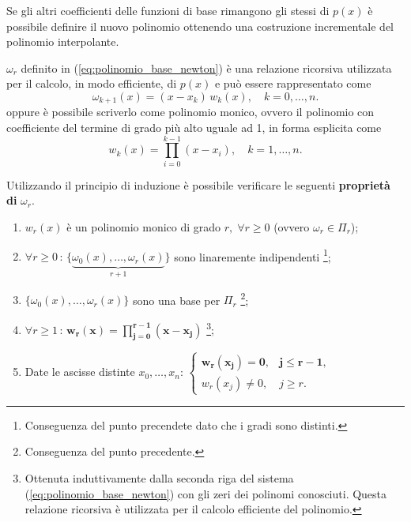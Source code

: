 
Se gli altri coefficienti delle funzioni di base rimangono gli stessi di $p(x)$ è possibile definire il nuovo polinomio ottenendo una costruzione incrementale del polinomio interpolante.

\begin{remark}
	$\omega_r$ definito in (\ref{eq:polinomio_base_newton}) è una relazione ricorsiva utilizzata per il calcolo, in modo efficiente, di $p(x)$ e può essere rappresentato come
	\begin{equation*}
	    \omega_{k+1}(x)=(x-x_k)\, w_k(x),\quad k=0,\hdots, n.
	\end{equation*}
	oppure è possibile scriverlo come polinomio monico, ovvero il polinomio con coefficiente del termine di grado più alto uguale ad 1, in forma esplicita come
	\begin{equation}\label{polinomio_base_newton2}
	    w_k(x)=\prod_{i=0}^{k-1}(x-x_i),\quad k=1,\hdots,n.
	\end{equation}
\end{remark}

Utilizzando il principio di induzione è possibile verificare le seguenti \textbf{proprietà di} $\omega_r$.
\begin{property}
	\begin{enumerate}
	    \item $w_r(x)$ è un polinomio monico di grado $r,\; \forall r\geq 0$ (ovvero $\omega_r\in\Pi_r$);
	    \item $\forall r\geq 0 \, :\, \{\underbrace{\omega_0(x), \hdots, \omega_r(x)}_{r+1}\}$ sono linaremente indipendenti \footnote{Conseguenza del punto precendete dato che i gradi sono distinti.};
	    \item $\{\omega_0(x),\hdots,\omega_r(x)\}$ sono una base per $\Pi_r$ \footnote{Conseguenza del punto precedente.};
	    \item $\forall r \geq 1\,:\, \boldsymbol{w_r(x)=\prod_{j=0}^{r-1}(x-x_j)}$ \footnote{Ottenuta induttivamente dalla seconda riga del sistema (\ref{eq:polinomio_base_newton}) con gli zeri dei polinomi conosciuti. Questa relazione ricorsiva è utilizzata per il calcolo efficiente del polinomio.};
	    \item Date le ascisse distinte $x_0, \hdots, x_n$:
	        $\begin{cases}
	        \boldsymbol{w_r(x_j)=0}, & \boldsymbol{j\leq r-1},\\
	        w_r(x_j)\neq 0, & j\geq r.
	        \end{cases}$
	\end{enumerate}
\end{property}

